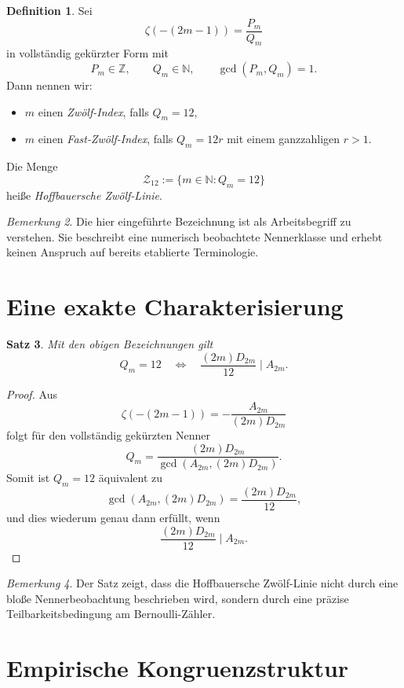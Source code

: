 \documentclass[11pt,a4paper]{article}
\theoremstyle{definition}
\newtheorem{definition}{Definition}[section]
\theoremstyle{plain}
\newtheorem{satz}[definition]{Satz}
\theoremstyle{remark}
\newtheorem{bemerkung}[definition]{Bemerkung}
\begin{document}
\begin{definition}
Sei
\[
\zeta(-(2m-1))=\frac{P_m}{Q_m}
\]
in vollständig gekürzter Form mit
\[
P_m\in\mathbb Z,\qquad Q_m\in\mathbb N,\qquad \gcd(P_m,Q_m)=1.
\]
Dann nennen wir:
\begin{itemize}
\item $m$ einen \emph{Zwölf-Index}, falls $Q_m=12$,
\item $m$ einen \emph{Fast-Zwölf-Index}, falls $Q_m=12r$ mit einem ganzzahligen $r>1$.
\end{itemize}
Die Menge
\[
\mathcal Z_{12}:=\{m\in\mathbb N:Q_m=12\}
\]
heiße \emph{Hoffbauersche Zwölf-Linie}.
\end{definition}

\begin{bemerkung}
Die hier eingeführte Bezeichnung ist als Arbeitsbegriff zu verstehen. Sie beschreibt eine numerisch beobachtete Nennerklasse und erhebt keinen Anspruch auf bereits etablierte Terminologie.
\end{bemerkung}

\section{Eine exakte Charakterisierung}

\begin{satz}
Mit den obigen Bezeichnungen gilt
\[
Q_m=12
\quad\Longleftrightarrow\quad
\frac{(2m)D_{2m}}{12}\mid A_{2m}.
\]
\end{satz}

\begin{proof}
Aus
\[
\zeta(-(2m-1))=-\frac{A_{2m}}{(2m)D_{2m}}
\]
folgt für den vollständig gekürzten Nenner
\[
Q_m=\frac{(2m)D_{2m}}{\gcd(A_{2m},(2m)D_{2m})}.
\]
Somit ist $Q_m=12$ äquivalent zu
\[
\gcd(A_{2m},(2m)D_{2m})=\frac{(2m)D_{2m}}{12},
\]
und dies wiederum genau dann erfüllt, wenn
\[
\frac{(2m)D_{2m}}{12}\mid A_{2m}.
\]
\end{proof}

\begin{bemerkung}
Der Satz zeigt, dass die Hoffbauersche Zwölf-Linie nicht durch eine bloße Nennerbeobachtung beschrieben wird, sondern durch eine präzise Teilbarkeitsbedingung am Bernoulli-Zähler.
\end{bemerkung}

\section{Empirische Kongruenzstruktur}
\end{document}
